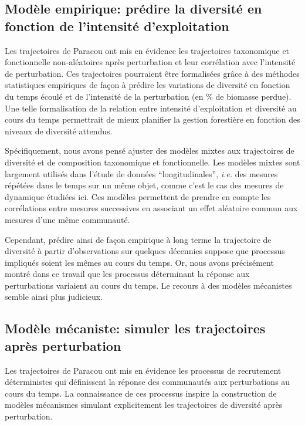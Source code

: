 \documentclass[
  11pt,
  french,
  A4paper,
  extrafontsizes,onecolumn,openright
  ]{memoir}
\begin{document}
\subsection{Modèle empirique: prédire la diversité en fonction de
l'intensité
d'exploitation}\label{modele-empirique-predire-la-diversite-en-fonction-de-lintensite-dexploitation}

Les trajectoires de Paracou ont mis en évidence les trajectoires
taxonomique et fonctionnelle non-aléatoires après perturbation et leur
corrélation avec l'intensité de perturbation. Ces trajectoires
pourraient être formalisées grâce à des méthodes statistiques empiriques
de façon à prédire les variations de diversité en fonction du temps
écoulé et de l'intensité de la perturbation (en \% de biomasse perdue).
Une telle formalisation de la relation entre intensité d'exploitation et
diversité au cours du temps permettrait de mieux planifier la gestion
forestière en fonction des niveaux de diversité attendus.

Spécifiquement, nous avons pensé ajuster des modèles mixtes aux
trajectoires de diversité et de composition taxonomique et
fonctionnelle. Les modèles mixtes sont largement utilisés dans l'étude
de données ``longitudinales'', \emph{i.e.} des mesures répétées dans le
temps sur un même objet, comme c'est le cas des mesures de dynamique
étudiées ici. Ces modèles permettent de prendre en compte les
corrélations entre mesures successives en associant un effet aléatoire
commun aux mesures d'une même communauté.

Cependant, prédire ainsi de façon empirique à long terme la trajectoire
de diversité à partir d'observations sur quelques décennies suppose que
processus impliqués soient les mêmes au cours du temps. Or, nous avons
précisément montré dans ce travail que les processus déterminant la
réponse aux perturbations variaient au cours du temps. Le recours à des
modèles mécanistes semble ainsi plus judicieux.

\subsection{Modèle mécaniste: simuler les trajectoires après
perturbation}\label{modele-mecaniste-simuler-les-trajectoires-apres-perturbation}

Les trajectoires de Paracou ont mis en évidence les processus de
recrutement déterministes qui définissent la réponse des communautés aux
perturbations au cours du temps. La connaissance de ces processus
inspire la construction de modèles mécanismes simulant explicitement les
trajectoires de diversité après perturbation.
\end{document}

